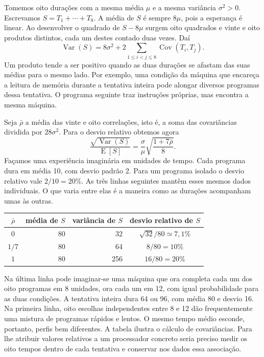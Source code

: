 Tomemos oito durações com a mesma média \(\mu\) e a mesma variância
\(\sigma^2>0\). Escrevamos \(S=T_1+\cdots+T_8\). A média de \(S\) é
sempre \(8\mu\), pois a esperança é linear. Ao desenvolver o quadrado
de \(S-8\mu\) surgem oito quadrados e vinte e oito produtos distintos,
cada um destes contado duas vezes. Daí
\[
 \operatorname{Var}(S)=8\sigma^2+
      2\sum_{1\leq i<j\leq8}\operatorname{Cov}(T_i,T_j).
\]
Um produto tende a ser positivo quando as duas durações se afastam das
suas médias para o mesmo lado. Por exemplo, uma condição da máquina
que encareça a leitura de memória durante a tentativa inteira pode
alongar diversos programas dessa tentativa. O programa seguinte traz
instruções próprias, mas encontra a mesma máquina.

Seja \(\bar\rho\) a média das vinte e oito correlações, isto é, a
soma das covariâncias dividida por \(28\sigma^2\). Para o desvio
relativo obtemos agora
\[
 \frac{\sqrt{\operatorname{Var}(S)}}{\operatorname E[S]}
       =\frac{\sigma}{\mu}\sqrt{\frac{1+7\bar\rho}{8}} .
\]
Façamos uma experiência imaginária em unidades de tempo. Cada
programa dura em média 10, com desvio padrão 2. Para um programa
isolado o desvio relativo vale \(2/10=20\%\). As três linhas seguintes
mantêm esses mesmos dados individuais. O que varia entre elas é a
maneira como as durações acompanham umas às outras.

\begin{center}
\begin{tabular}{c|r|r|c}
\(\bar\rho\)&média de \(S\)&variância de \(S\)&desvio relativo de \(S\)\\
\hline
\(0\)&80&32&\(\sqrt{32}/80\simeq7{,}1\%\)\\
\(1/7\)&80&64&\(8/80=10\%\)\\
\(1\)&80&256&\(16/80=20\%\)
\end{tabular}
\end{center}

Na última linha pode imaginar-se uma máquina que ora completa cada um
dos oito programas em 8 unidades, ora cada um em 12, com igual
probabilidade para as duas condições. A tentativa inteira dura 64 ou
96, com média 80 e desvio 16. Na primeira linha, oito escolhas
independentes entre 8 e 12 dão frequentemente uma mistura de programas
rápidos e lentos. O mesmo tempo médio esconde, portanto, perfis bem
diferentes. A tabela ilustra o cálculo de covariâncias. Para lhe atribuir
valores relativos a um processador concreto seria preciso medir os oito
tempos dentro de cada tentativa e conservar nos dados essa associação.

